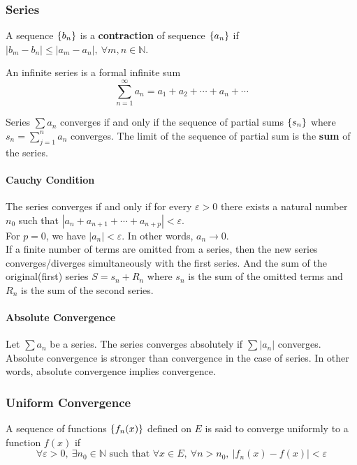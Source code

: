 \subsubsection{Series}
\begin{definition}
	A sequence $\left\{b_n\right\}$ is a \textbf{contraction} of sequence $\left\{a_n\right\}$ if $|b_m-b_n| \le |a_m - a_n|,\ \forall m,n \in \mathbb{N}$.
\end{definition}

\begin{definition}
	An infinite series is a formal infinite sum
	\[ \sum_{n = 1}^\infty a_n = a_1 + a_2 + \dotsb + a_n + \dotsb \]
\end{definition}
\begin{definition}
	Series $\sum a_n$ converges if and only if the sequence of partial sums $\left\{s_n\right\}$ where $s_n = \sum_{j=1}^n a_n$ converges.
	The limit of the sequence of partial sum is the \textbf{sum} of the series.
\end{definition}
\paragraph{Cauchy Condition}
The series converges if and only if for every $\varepsilon > 0$ there exists a natural number $n_0$ such that $|a_n + a_{n+1}+\dotsb+a_{n+p}| < \varepsilon$.\\

For $p=0$, we have $|a_n| < \varepsilon$.
In other words, $a_n \to 0$.\\

If a finite number of terms are omitted from a series, then the new series converges/diverges simultaneously with the first series.
And the sum of the original(first) series $S = s_n + R_n$ where $s_n$ is the sum of the omitted terms and $R_n$ is the sum of the second series.

\paragraph{Absolute Convergence}
Let $\sum a_n$ be a series.
The series converges absolutely if $\sum |a_n|$ converges.
Absolute convergence is stronger than convergence in the case of series.
In other words, absolute convergence implies convergence.

\subsubsection{Uniform Convergence}
\begin{definition}
	A sequence of functions $\left\{f_n(x)\right\}$ defined on $E$ is said to converge uniformly to a function $f(x)$ if
	\[ \forall \varepsilon > 0, \ \exists n_0 \in \mathbb{N} \text{ such that } \forall x \in E,\ \forall n > n_0, \ |f_n(x)-f(x)| < \varepsilon \]
\end{definition}

